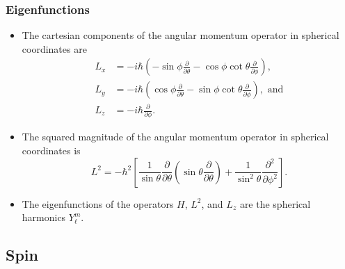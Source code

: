 \documentclass{article}
\begin{document}
\subsubsection{Eigenfunctions}

\begin{itemize}
  \item The cartesian components of the angular momentum operator in spherical coordinates are \begin{align*}
          L_x & = -i \hbar \left( -\sin \phi \frac{\partial}{\partial \theta} - \cos \phi \cot \theta \frac{\partial}{\partial \phi} \right),            \\
          L_y & = -i \hbar \left( \cos \phi \frac{\partial}{\partial \theta} - \sin \phi \cot \theta \frac{\partial}{\partial \phi} \right), \text{ and} \\
          L_z & = -i \hbar \frac{\partial}{\partial \phi}.
        \end{align*}

  \item The squared magnitude of the angular momentum operator in spherical coordinates is \[L^2 = -\hbar^2 \left[ \frac{1}{\sin \theta} \frac{\partial}{\partial \theta} \left( \sin \theta \frac{\partial}{\partial \theta} \right) + \frac{1}{\sin^2 \theta} \frac{\partial^2}{\partial \phi^2} \right].\]

  \item The eigenfunctions of the operators $H$, $L^2$, and $L_z$ are the spherical harmonics $Y_\ell^m$.
\end{itemize}

\subsection{Spin}
\end{document}
